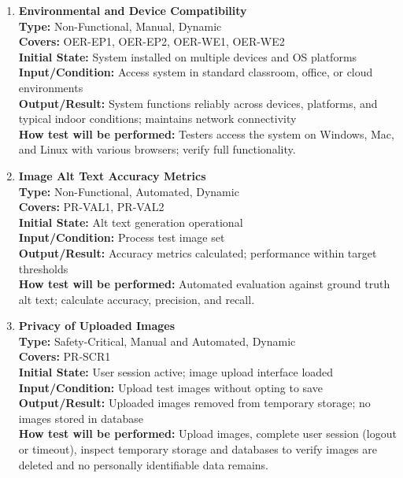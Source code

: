 \documentclass[12pt, titlepage]{article}
\begin{document}
\begin{enumerate}[label=NFR-ST \arabic*., wide=0pt, leftmargin=*]
  \item \textbf{Environmental and Device Compatibility} \\[2mm]
    \textbf{Type:} Non-Functional, Manual, Dynamic \\
    \textbf{Covers:} OER-EP1, OER-EP2, OER-WE1, OER-WE2 \\
    \textbf{Initial State:} System installed on multiple devices and
    OS platforms \\
    \textbf{Input/Condition:} Access system in standard classroom,
    office, or cloud environments \\
    \textbf{Output/Result:} System functions reliably across devices,
    platforms, and typical indoor conditions; maintains network
    connectivity \\[2mm]
    \textbf{How test will be performed:} Testers access the system on
    Windows, Mac, and Linux with various browsers; verify full functionality.

  \item \textbf{Image Alt Text Accuracy Metrics} \\[2mm]
    \textbf{Type:} Non-Functional, Automated, Dynamic \\
    \textbf{Covers:} PR-VAL1, PR-VAL2 \\
    \textbf{Initial State:} Alt text generation operational \\
    \textbf{Input/Condition:} Process test image set \\
    \textbf{Output/Result:} Accuracy metrics calculated; performance
    within target thresholds \\[2mm]
    \textbf{How test will be performed:} Automated evaluation against
    ground truth alt text; calculate accuracy, precision, and recall.

  \item \textbf{Privacy of Uploaded Images} \\[2mm]
    \textbf{Type:} Safety-Critical, Manual and Automated, Dynamic \\
    \textbf{Covers:} PR-SCR1 \\
    \textbf{Initial State:} User session active; image upload
    interface loaded \\
    \textbf{Input/Condition:} Upload test images without opting to save \\
    \textbf{Output/Result:} Uploaded images removed from temporary
    storage; no images stored in database \\[2mm]
    \textbf{How test will be performed:}
    Upload images, complete user session (logout or timeout), inspect
    temporary storage and databases to verify images are deleted and
    no personally identifiable data remains.


\end{enumerate}
\end{document}
